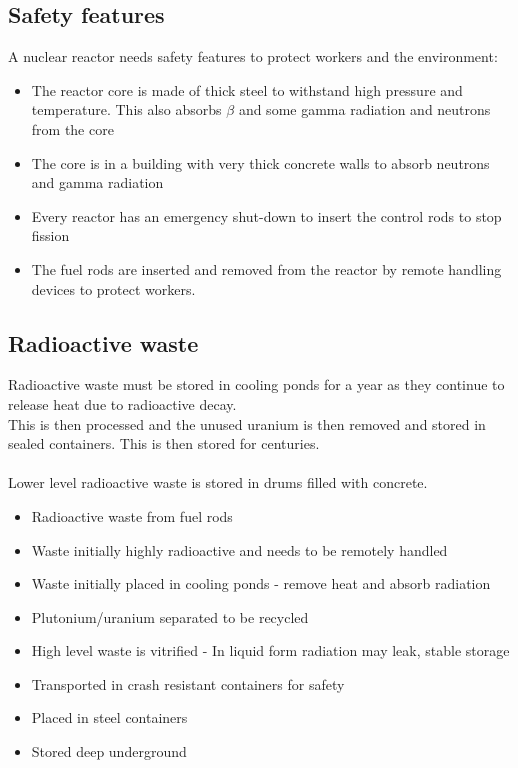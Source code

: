 \documentclass{article}[18pt]
\begin{document}
\subsection{Safety features}
A nuclear reactor needs safety features to protect workers and the environment:
\begin{itemize}
\item The reactor core is made of thick steel to withstand high pressure and temperature. This also absorbs $\beta$ and some gamma radiation and neutrons from the core
\item The core is in a building with very thick concrete walls to absorb neutrons and gamma radiation
\item Every reactor has an emergency shut-down to insert the control rods to stop fission
\item The fuel rods are inserted and removed from the reactor by remote handling devices to protect workers.
\end{itemize}
\subsection{Radioactive waste}
Radioactive waste must be stored in cooling ponds for a year as they continue to release heat due to radioactive decay.\\
This is then processed and the unused uranium is then removed and stored in sealed containers. This is then stored for centuries.\\
\\
Lower level radioactive waste is stored in drums filled with concrete.
\begin{itemize}
\item Radioactive waste from fuel rods
\item Waste initially highly radioactive and needs to be remotely handled
\item Waste initially placed in cooling ponds - remove heat and absorb radiation
\item Plutonium/uranium separated to be recycled
\item High level waste is vitrified - In liquid form radiation may leak, stable storage
\item Transported in crash resistant containers for safety
\item Placed in steel containers
\item Stored deep underground
\end{itemize}
\end{document}
